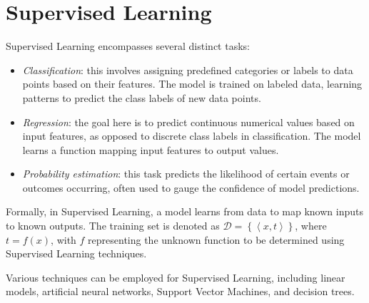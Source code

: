 \section{Supervised Learning}

Supervised Learning encompasses several distinct tasks:
\begin{itemize}
    \item \textit{Classification}: this involves assigning predefined categories or labels to data points based on their features. 
        The model is trained on labeled data, learning patterns to predict the class labels of new data points.
    \item \textit{Regression}: the goal here is to predict continuous numerical values based on input features, as opposed to discrete class labels in classification. 
        The model learns a function mapping input features to output values.
    \item \textit{Probability estimation}: this task predicts the likelihood of certain events or outcomes occurring, often used to gauge the confidence of model predictions.
\end{itemize}
Formally, in Supervised Learning, a model learns from data to map known inputs to known outputs. 
The training set is denoted as $\mathcal{D}=\left\{\left\langle x,t \right\rangle\right\}$, where $t = f(x)$, with $f$ representing the unknown function to be determined using Supervised Learning techniques.

Various techniques can be employed for Supervised Learning, including linear models, artificial neural networks, Support Vector Machines, and decision trees.